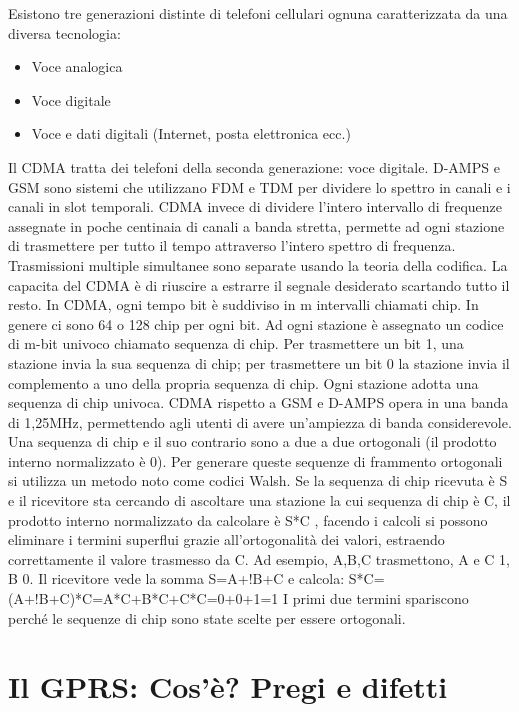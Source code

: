 Esistono tre generazioni distinte di telefoni cellulari ognuna caratterizzata da una diversa tecnologia:
\begin{itemize}
\item	Voce analogica
\item	Voce digitale
\item	Voce e dati digitali (Internet, posta elettronica ecc.)
\end{itemize}
Il CDMA tratta dei telefoni della seconda generazione: voce digitale.
D-AMPS e GSM sono sistemi che utilizzano FDM e TDM per dividere lo spettro in canali e i canali in slot temporali. CDMA invece di dividere l’intero intervallo di frequenze assegnate in poche centinaia di canali a banda stretta, permette ad ogni stazione di trasmettere per tutto il tempo attraverso l’intero spettro di frequenza. Trasmissioni multiple simultanee sono separate usando la teoria della codifica. La capacita del CDMA è di riuscire a estrarre il segnale desiderato scartando tutto il resto.
In CDMA, ogni tempo bit è suddiviso in m intervalli chiamati chip. In genere ci sono 64 o 128 chip per ogni bit. Ad ogni stazione è assegnato un codice di m-bit univoco chiamato sequenza di chip.
Per trasmettere un bit 1, una stazione invia la sua sequenza di chip; per trasmettere un bit 0 la stazione invia il complemento a uno della propria sequenza di chip.
Ogni stazione adotta una sequenza di chip univoca.
CDMA rispetto a GSM e D-AMPS opera in una banda di 1,25MHz, permettendo agli utenti di avere un’ampiezza di banda considerevole.
Una sequenza di chip e il suo contrario sono a due a due ortogonali (il prodotto interno normalizzato è 0). Per generare queste sequenze di frammento ortogonali si utilizza un metodo noto come codici Walsh. 
Se la sequenza di chip ricevuta è S e il ricevitore sta cercando di ascoltare una stazione la cui sequenza di chip è C, il prodotto interno normalizzato da calcolare è S*C , facendo i calcoli si possono eliminare i termini superflui grazie all’ortogonalità dei valori, estraendo correttamente il valore trasmesso da C. 
Ad esempio, A,B,C trasmettono, A e C 1, B 0. Il ricevitore vede la somma S=A+!B+C e calcola:
S*C=(A+!B+C)*C=A*C+B*C+C*C=0+0+1=1
I primi due termini spariscono perché le sequenze di chip sono state scelte per essere ortogonali.

\section{Il GPRS: Cos’è? Pregi e difetti}

